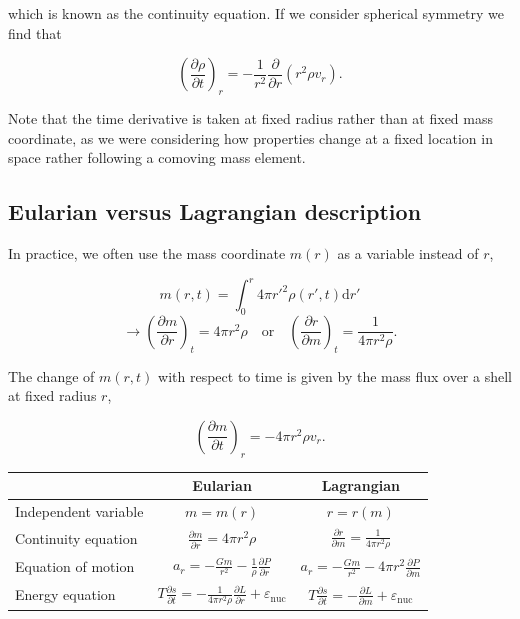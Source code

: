 \documentclass[twocolumn]{article}
\begin{document}
which is known as the continuity equation. If we consider spherical
symmetry we find that

\[\left(\frac{\partial \rho}{\partial t}\right)_r=-\frac{1}{r^2}\frac{\partial}{\partial r}\left(r^2 \rho v_r\right).\tag{1.1}\]

Note that the time derivative is taken at fixed radius rather than at
fixed mass coordinate, as we were considering how properties change at a
fixed location in space rather following a comoving mass element.

\hypertarget{eularian-versus-lagrangian-description}{%
\subsection{Eularian versus Lagrangian
description}\label{eularian-versus-lagrangian-description}}

In practice, we often use the mass coordinate \(m(r)\) as a variable
instead of \(r\),

\[m(r,t)=\int_0^r 4\pi r'^{2} \rho(r',t) \mathrm{d}r'\tag{1.2}\]
\[\rightarrow \left(\frac{\partial m}{\partial r}\right)_t = 4\pi r^2\rho\quad\mathrm{or}\quad\left(\frac{\partial r}{\partial m}\right)_t = \frac{1}{4\pi r^2\rho}\tag{1.3}.\]

The change of \(m(r,t)\) with respect to time is given by the mass flux
over a shell at fixed radius \(r\),

\[\left(\frac{\partial m}{\partial t}\right)_r = -4\pi r^2 \rho v_r. \tag{1.4}\]

\begin{table}
  \begin{center}
  \begin{tabular}{l|cc}
    & Eularian & Lagrangian \\
    \hline
    Independent variable & \(m=m(r)\) & \(r=r(m)\) \\
    Continuity equation &
    \(\displaystyle\frac{\partial m}{\partial r}=4\pi r^2\rho\) &
    \(\displaystyle{\frac{\partial r}{\partial m}}=\frac{1}{4\pi r^2 \rho}\) \\
    Equation of motion &
    \(\displaystyle a_r = -\frac{Gm}{r^2} - \frac{1}{\rho}\frac{\partial P}{\partial r}\)
    &
    \(\displaystyle a_r = -\frac{Gm}{r^2} - 4\pi r^2\frac{\partial P}{\partial m}\) \\
    Energy equation &
    \(\displaystyle T\frac{\partial s}{\partial t}=-\frac{1}{4\pi r^2 \rho}\frac{\partial L}{\partial r}+\varepsilon_\mathrm{nuc}\)
    &
    \(\displaystyle T\frac{\partial s}{\partial t}=-\frac{\partial L}{\partial m}+\varepsilon_\mathrm{nuc}\)
  \end{tabular}
\end{center}
\end{table}
\end{document}
